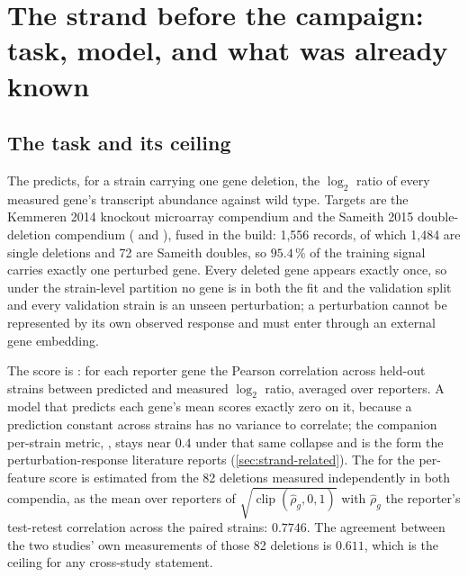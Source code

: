 
\section{The strand before the campaign: task, model, and what was already known
}
\label{sec:strand}

\subsection{The task and its ceiling}
\label{sec:strand-task}

The  predicts, for a strain carrying one gene deletion, the
$\log_2$ ratio of every measured gene's transcript abundance against wild type. Targets are
the Kemmeren 2014 knockout microarray compendium and the Sameith 2015 double-deletion
compendium ( and ),
fused in the  build: 1{,}556 records, of which 1{,}484 are single deletions and 72 are
Sameith doubles, so $95.4\,\%$ of the training signal carries exactly one perturbed gene.
Every deleted gene appears exactly once, so under the strain-level partition no gene is in
both the fit and the validation split and every validation strain is an unseen
perturbation; a perturbation cannot be represented by its own observed response and must
enter through an external gene embedding.

The score is : for each reporter gene the Pearson correlation
across held-out strains between predicted and measured $\log_2$ ratio, averaged over
reporters. A model that predicts each gene's mean scores exactly zero on it, because a
prediction constant across strains has no variance to correlate; the companion per-strain
metric, , stays near $0.4$ under that same collapse and is the
form the perturbation-response literature reports (\cref{sec:strand-related}). The
 for the per-feature score is estimated from the 82 deletions
measured independently in both compendia, as the mean over reporters of
$\sqrt{\operatorname{clip}(\hat\rho_g, 0, 1)}$ with $\hat\rho_g$ the reporter's test-retest
correlation across the paired strains: $\mathbf{0.7746}$. The agreement between the two
studies' own measurements of those 82 deletions is $0.611$, which is the ceiling for any
cross-study statement.

